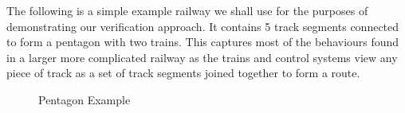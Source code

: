 The following is a simple example railway we shall use for the purposes of demonstrating our verification approach.  It contains 5 track segments connected to form a pentagon with two trains. This captures most of the behaviours found in a larger more complicated railway as the trains and control systems view any piece of track as a set of track segments joined together to form a route.

\begin{figure} [h!]

\begin{center}
\end{center}

\label{fig:trackplan}
 \caption{Pentagon Example}
\end{figure}

